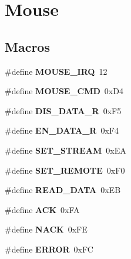\hypertarget{group__Mouse}{}\section{Mouse}
\label{group__Mouse}
\subsection*{Macros}
\begin{DoxyCompactItemize}
\item 
\mbox{\label{group__Mouse_ga85964cb90343bb1a029b1d1b4229f910}} 
\#define {\bfseries M\+O\+U\+S\+E\+\_\+\+I\+RQ}~12
\item 
\mbox{\label{group__Mouse_ga6b0609c88f375140a5620a4c02282f39}} 
\#define {\bfseries M\+O\+U\+S\+E\+\_\+\+C\+MD}~0x\+D4
\item 
\mbox{\label{group__Mouse_ga90ea2cace6b0b531e582a0cad0c875c3}} 
\#define {\bfseries D\+I\+S\+\_\+\+D\+A\+T\+A\+\_\+R}~0x\+F5
\item 
\mbox{\label{group__Mouse_ga2c492e3a28d57a332b549909b2797519}} 
\#define {\bfseries E\+N\+\_\+\+D\+A\+T\+A\+\_\+R}~0x\+F4
\item 
\mbox{\label{group__Mouse_ga08006958f5bcad29209b983904b878ee}} 
\#define {\bfseries S\+E\+T\+\_\+\+S\+T\+R\+E\+AM}~0x\+EA
\item 
\mbox{\label{group__Mouse_gaba54f039c67867bcdc9e18024147c71a}} 
\#define {\bfseries S\+E\+T\+\_\+\+R\+E\+M\+O\+TE}~0x\+F0
\item 
\mbox{\label{group__Mouse_ga8d406d5aff787991429e62cfd9bac721}} 
\#define {\bfseries R\+E\+A\+D\+\_\+\+D\+A\+TA}~0x\+EB
\item 
\mbox{\label{group__Mouse_ga6f6489887e08bff4887d0bc5dcf214d8}} 
\#define {\bfseries A\+CK}~0x\+FA
\item 
\mbox{\label{group__Mouse_ga958518a45b12053ae33606ee7cb68a55}} 
\#define {\bfseries N\+A\+CK}~0x\+FE
\item 
\mbox{\label{group__Mouse_ga8fe83ac76edc595f6b98cd4a4127aed5}} 
\#define {\bfseries E\+R\+R\+OR}~0x\+FC
\end{DoxyCompactItemize}
